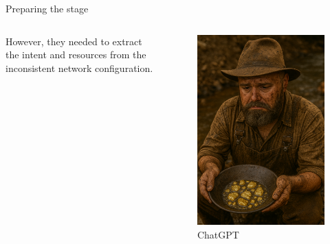 \documentclass[aspectratio=169]{beamer}
\begin{document}
\begin{frame}{Preparing the stage}

  \begin{columns}
    \begin{column}{0.4\textwidth}
      However, they needed to extract the intent and resources from the inconsistent network configuration.
    \end{column}
    \begin{column}{0.4\textwidth}
      \begin{figure}
        \includegraphics[height = 0.7\textheight]{images/urs_gold_rush_glory.png}
        \caption{\footnotesize ChatGPT}
      \end{figure}
    \end{column}
  \end{columns}

\end{frame}
\end{document}

